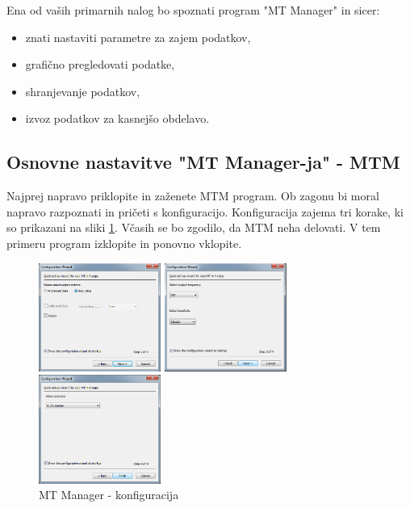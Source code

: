 \noindent
Ena od vaših primarnih nalog bo spoznati program "MT Manager" in sicer:
\begin{itemize}
	\item znati nastaviti parametre za zajem podatkov,
	\item grafično pregledovati podatke,
	\item shranjevanje podatkov,
	\item izvoz podatkov za kasnejšo obdelavo.
\end{itemize}

\newpage
\subsection{Osnovne nastavitve "MT Manager-ja" - MTM}
Najprej napravo priklopite in zaženete MTM program. Ob zagonu bi moral napravo razpoznati in pričeti s konfiguracijo. Konfiguracija zajema tri korake, ki so prikazani na sliki \ref{fig:v_mems_mtm_cnfg}. Včasih se bo zgodilo, da MTM neha delovati. V tem primeru program izklopite in ponovno vklopite.

\begin{figure}[!htbp]
	\begin{minipage}{3.5cm}
		\centering \includegraphics[width=4cm]{Vaje/ManevrZMems/figs/mtm_cnfg_01.png}
	\end{minipage}
	\hfill
	\begin{minipage}{3.5cm}
		\centering \includegraphics[width=4cm]{Vaje/ManevrZMems/figs/mtm_cnfg_02.png}
	\end{minipage}
	\hfill
	\begin{minipage}{3.5cm}
		\centering \includegraphics[width=4cm]{Vaje/ManevrZMems/figs/mtm_cnfg_03.png}
	\end{minipage}
	\caption{MT Manager - konfiguracija}
	\label{fig:v_mems_mtm_cnfg}
\end{figure}

